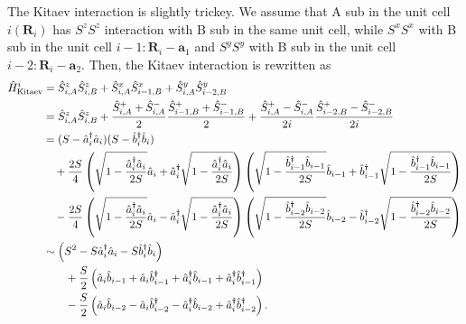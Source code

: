 \documentclass[11pt, aps, longbibliography]{article}
\begin{document}
The Kitaev interaction is slightly trickey. 
We assume that A sub in the unit cell $i (\bm{R}_i)$  has $S^zS^z$ interaction with B sub in the same unit cell, while $S^xS^x$ with B sub in the unit cell $i-1: \bm{R}_i-\bm{a}_1$ and $S^yS^y$ with B sub in the unit cell $i-2: \bm{R}_i-\bm{a}_2$.
Then, the Kitaev interaction is rewritten as
\begin{align}
    \hat{H}_{\rm Kitaev}^i &= \hat{S}^z_{i,A}\hat{S}^z_{i,B} + \hat{S}^x_{i,A}\hat{S}^x_{i-1,B} + \hat{S}^y_{i,A}\hat{S}^y_{i-2,B} \notag  \\
    &=  \hat{S}^z_{i,A}\hat{S}^z_{i,B} + \frac{\hat{S}^+_{i,A} + \hat{S}^-_{i,A}}{2}\frac{\hat{S}^+_{i-1,B} + \hat{S}^-_{i-1,B}}{2} + \frac{\hat{S}^+_{i,A} - \hat{S}^-_{i,A}}{2i}\frac{\hat{S}^+_{i-2, B} - \hat{S}^-_{i-2, B}}{2i} \notag\\
    &= (S-\hat{a}^\dagger_i \hat{a}_i)(S-\hat{b}^\dagger_i \hat{b}_i)  \notag \\ 
    & \quad  +\frac{2S}{4} \left(  \sqrt{1-\frac{\hat{a}^\dagger_i \hat{a}_i}{2S}} \hat{a}_i + \hat{a}^{\dagger}_i \sqrt{1-\frac{\hat{a}^\dagger_i \hat{a}_i}{2S}} \right) \left(  \sqrt{1-\frac{\hat{b}^\dagger_{i-1} \hat{b}_{i-1}}{2S}} \hat{b}_{i-1} + \hat{b}^{\dagger}_{i-1} \sqrt{1-\frac{\hat{b}^\dagger_{i-1} \hat{b}_{i-1}}{2S}} \right) \notag \\ 
    & \quad  -\frac{2S}{4} \left(  \sqrt{1-\frac{\hat{a}^\dagger_i \hat{a}_i}{2S}} \hat{a}_i - \hat{a}^{\dagger}_i \sqrt{1-\frac{\hat{a}^\dagger_i \hat{a}_i}{2S}} \right) \left(  \sqrt{1-\frac{\hat{b}^\dagger_{i-2} \hat{b}_{i-2}}{2S}} \hat{b}_{i-2} - \hat{b}^{\dagger}_{i-2} \sqrt{1-\frac{\hat{b}^\dagger_{i-2} \hat{b}_{i-2}}{2S}} \right) \notag \\
    &\sim \left( S^2 -S \hat{a}^\dagger_i \hat{a}_i -S\hat{b}^\dagger_i \hat{b}_i   \right)  \notag \\ 
    & \quad \quad  + \frac{S}{2} \left( \hat{a}_i\hat{b}_{i-1} + \hat{a}_i\hat{b}_{i-1}^\dagger + \hat{a}_i^\dagger \hat{b}_{i-1} + \hat{a}_i^\dagger\hat{b}_{i-1}^\dagger \right) \notag \\
    & \quad \quad  - \frac{S}{2} \left( \hat{a}_i\hat{b}_{i-2} - \hat{a}_i\hat{b}_{i-2}^\dagger - \hat{a}_i^\dagger \hat{b}_{i-2} + \hat{a}_i^\dagger\hat{b}_{i-2}^\dagger \right). 
\end{align} 
\end{document}
